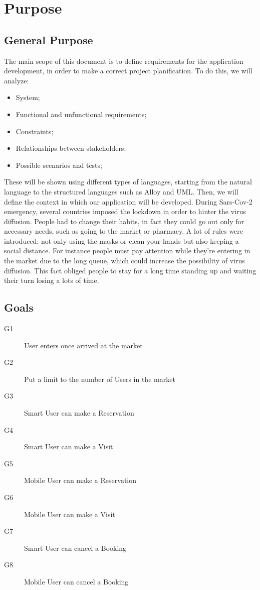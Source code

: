 \section{Purpose}
\subsection{General Purpose}

The main scope of this document is to define requirements for the application development, in order to make a correct project planification. 
To do this, we will analyze:

\begin{itemize}
\item System;
\item Functional and unfunctional requirements;
\item Constraints;
\item Relationships between stakeholders;
\item Possible scenarios and tests;
\end{itemize}
\medskip
These will be shown using different types of languages, starting from the natural language to the structured languages such as Alloy and UML.
Then, we will define the context in which our application will be developed.
During Sars-Cov-2 emergency, several countries imposed the lockdown in order to hinter the virus diffusion.
People had to change their habits, in fact they could go out only for necessary needs, such as going to the market or pharmacy.
A lot of rules were introduced: not only using the masks or clean your hands but also keeping a social distance.
For instance people must pay attention while they're entering in the market due to the long queue, which could increase the possibility of virus diffusion.
This fact obliged people to stay for a long time standing up and waiting their turn losing a lots of time. 




\subsection{Goals}
\begin{description}
    \item[G1]User enters once arrived at the market
    \item[G2]Put a limit to the number of Users in the market
    \item[G3]Smart User can make a Reservation
    \item[G4]Smart User can make a Visit
    \item[G5]Mobile User can make a Reservation
    \item[G6]Mobile User can make a Visit
    \item[G7]Smart User can cancel a Booking
    \item[G8]Mobile User can cancel a Booking
\end{description}

